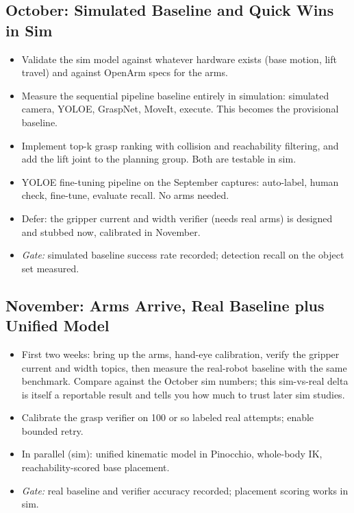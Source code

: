 \documentclass[12pt,a4paper]{article}
\begin{document}
\subsection*{October: Simulated Baseline and Quick Wins in Sim}
\begin{itemize}
  \item Validate the sim model against whatever hardware exists (base motion, lift travel) and
        against OpenArm specs for the arms.
  \item Measure the sequential pipeline baseline entirely in simulation: simulated camera,
        YOLOE, GraspNet, MoveIt, execute. This becomes the provisional baseline.
  \item Implement top-k grasp ranking with collision and reachability filtering, and add the lift
        joint to the planning group. Both are testable in sim.
  \item YOLOE fine-tuning pipeline on the September captures: auto-label, human check,
        fine-tune, evaluate recall. No arms needed.
  \item Defer: the gripper current and width verifier (needs real arms) is designed and stubbed
        now, calibrated in November.
  \item \textit{Gate:} simulated baseline success rate recorded; detection recall on the object set
        measured.
\end{itemize}

\subsection*{November: Arms Arrive, Real Baseline plus Unified Model}
\begin{itemize}
  \item First two weeks: bring up the arms, hand-eye calibration, verify the gripper current and
        width topics, then measure the real-robot baseline with the same benchmark. Compare
        against the October sim numbers; this sim-vs-real delta is itself a reportable result and
        tells you how much to trust later sim studies.
  \item Calibrate the grasp verifier on 100 or so labeled real attempts; enable bounded retry.
  \item In parallel (sim): unified kinematic model in Pinocchio, whole-body IK,
        reachability-scored base placement.
  \item \textit{Gate:} real baseline and verifier accuracy recorded; placement scoring works in sim.
\end{itemize}
\end{document}
